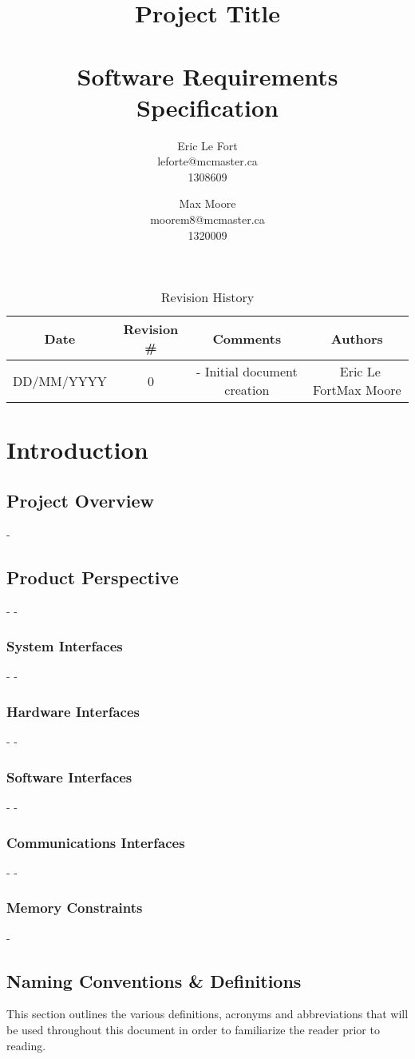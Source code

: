 \documentclass[titlepage]{article}
\title{Project Title\\~\\Software Requirements Specification}
\author{
 Eric Le Fort\\leforte@mcmaster.ca\\1308609\and
 Max Moore\\moorem8@mcmaster.ca\\1320009
 }
\begin{document}
 \maketitle
 
 
 \tableofcontents
 \listoffigures
 \listoftables
 
 
 \vfill
 \begin{table}[!htbp]
 \centering
 \begin{tabular}{| C{3} | C{2} | C{5} | C{2.5} |}\hline
 	Date			&Revision \#	&Comments						&Authors\\\hline
 	DD/MM/YYYY		&0				&- Initial document creation	&~Eric Le Fort\newline Max Moore\\\hline
 \end{tabular}
 \caption{Revision History}
 \end{table}
 \newpage
 
  \section{Introduction}
  \subsection{Project Overview}
 -\subsection{Product Perspective}
 -%
 -\subsubsection{System Interfaces}
 -%
 -\subsubsection{Hardware Interfaces}
 -%
 -\subsubsection{Software Interfaces}
 -%
 -\subsubsection{Communications Interfaces}
 -%
 -\subsubsection{Memory Constraints}
 -%
  \subsection{Naming Conventions \& Definitions}
  This section outlines the various definitions, acronyms and abbreviations that will be used throughout this document in order to familiarize the reader prior to reading.
\end{document}
